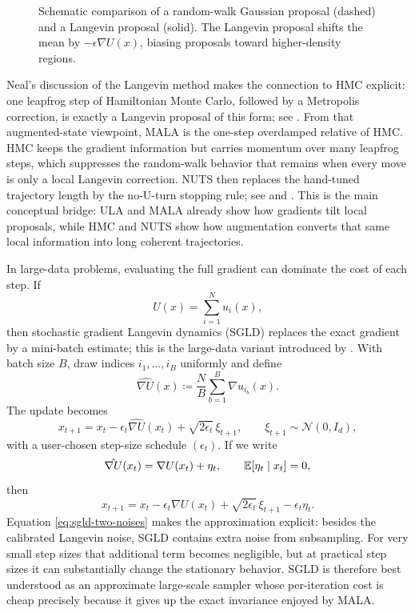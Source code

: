 \begin{figure}[t]
  \centering
  
  \caption{Schematic comparison of a random-walk Gaussian proposal (dashed) and a Langevin proposal (solid).
  The Langevin proposal shifts the mean by $-\epsilon\nabla U(x)$, biasing proposals toward higher-density regions.}
  \label{fig:mala-proposal-geometry}
\end{figure}

Neal's discussion of the Langevin method makes the connection to HMC explicit: one leapfrog step of Hamiltonian Monte Carlo, followed by a Metropolis correction, is exactly a Langevin proposal of this form; see \citet[\S5.2]{neal_2011_hmc}.
From that augmented-state viewpoint, MALA is the one-step overdamped relative of HMC.
HMC keeps the gradient information but carries momentum over many leapfrog steps, which suppresses the random-walk behavior that remains when every move is only a local Langevin correction.
NUTS then replaces the hand-tuned trajectory length by the no-U-turn stopping rule; see \citet[\S3.1]{hoffman_gelman_2014_nuts} and .
This is the main conceptual bridge: ULA and MALA already show how gradients tilt local proposals, while HMC and NUTS show how augmentation converts that same local information into long coherent trajectories.

In large-data problems, evaluating the full gradient can dominate the cost of each step.
If
\[
  U(x)=\sum_{i=1}^N u_i(x),
\]
then stochastic gradient Langevin dynamics (SGLD) replaces the exact gradient by a mini-batch estimate; this is the large-data variant introduced by \citet[\S3]{welling_teh_2011_sgld}.
With batch size $B$, draw indices $i_1,\dots,i_B$ uniformly and define
\[
  \hat{\nabla U}(x)
  \coloneqq
  \frac{N}{B}\sum_{b=1}^B \nabla u_{i_b}(x).
\]
The update becomes
\begin{equation}
  x_{t+1}
  =
  x_t - \epsilon_t\hat{\nabla U}(x_t) + \sqrt{2\epsilon_t}\,\xi_{t+1},
  \qquad
  \xi_{t+1}\sim\mathcal{N}(0,I_d),
  \label{eq:sgld-update}
\end{equation}
with a user-chosen step-size schedule $(\epsilon_t)$.
If we write
\[
  \hat{\nabla U}(x_t)=\nabla U(x_t)+\eta_t,
  \qquad
  \mathbb{E}[\eta_t\mid x_t]=0,
\]
then
\begin{equation}
  x_{t+1}
  =
  x_t - \epsilon_t\nabla U(x_t) + \sqrt{2\epsilon_t}\,\xi_{t+1} - \epsilon_t\eta_t.
  \label{eq:sgld-two-noises}
\end{equation}
Equation \eqref{eq:sgld-two-noises} makes the approximation explicit: besides the calibrated Langevin noise, SGLD contains extra noise from subsampling.
For very small step sizes that additional term becomes negligible, but at practical step sizes it can substantially change the stationary behavior.
SGLD is therefore best understood as an approximate large-scale sampler whose per-iteration cost is cheap precisely because it gives up the exact invariance enjoyed by MALA.

